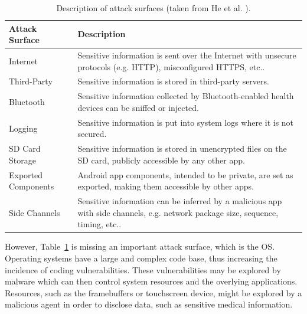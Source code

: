 \begin{table}[t]
	\caption {Description of attack surfaces (taken from He et al. \cite{he2014security}).}
	\label{tab:attacksurfaces}
	\begin{tabular}{|>{\raggedright}p{2cm}|>{\raggedright\arraybackslash}p{10cm}|}
		\hline
		\textbf{Attack Surface}      & \textbf{Description}                                                                                                                    \\ \hline
		Internet            & Sensitive information is sent over the Internet with unsecure protocols (e.g. HTTP), misconfigured HTTPS, etc..                 \\ \hline
		Third-Party         & Sensitive information is stored in third-party servers.                                                                      \\ \hline
		Bluetooth           & Sensitive information collected by Bluetooth-enabled health devices can be sniffed or injected.                    \\ \hline
		Logging             & Sensitive information is put into system logs where it is not secured.                                                       \\ \hline
		SD Card Storage     & Sensitive information is stored in unencrypted files on the SD card, publicly accessible by any other app.                         \\ \hline
		Exported Components &  Android app components, intended to be private, are set as exported, making them accessible by other apps.                    \\ \hline
		Side Channels       & Sensitive information can be inferred by a malicious app with side channels, e.g. network package size, sequence, timing, etc.. \\ \hline
	\end{tabular}
\end{table}

However, Table~\ref{tab:attacksurfaces} is missing an important attack surface, which is the OS. Operating systems have a large and complex code base, thus increasing the incidence of coding vulnerabilities. These vulnerabilities may be explored by malware which can then control system resources and the overlying applications. Resources, such as the framebuffers or touchscreen device, might be explored by a malicious agent in order to disclose data, such as sensitive medical information.


